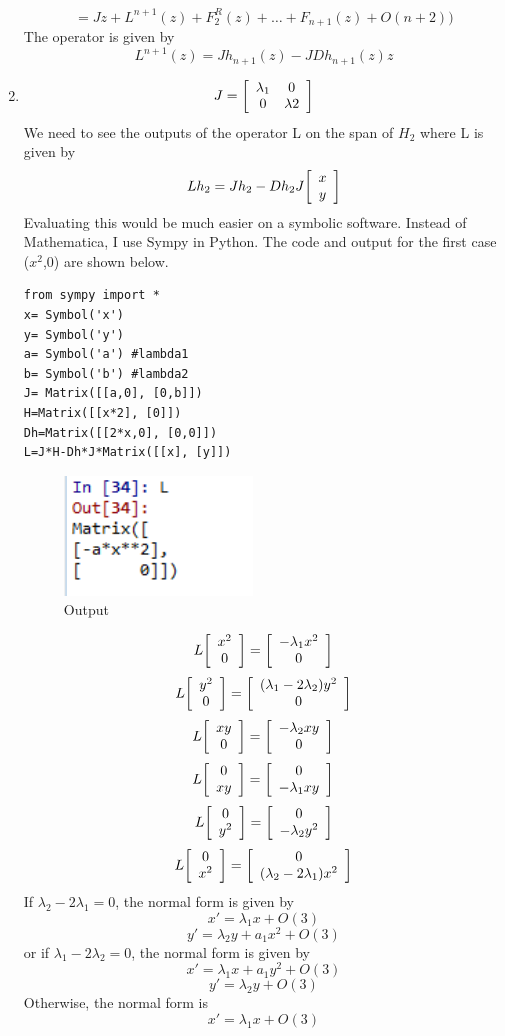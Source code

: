 \documentclass[a4paper,11pt]{article}
\newenvironment{mat}{\left[ \begin{array}{ccccccccccccc}}{\end{array}\right]}
\newcommand\bcm{\begin{mat}}
\newcommand\ecm{\end{mat}}
\begin{document}
\begin{enumerate}
\[= Jz + L^{n+1}(z) + F_2^R(z)+\ldots + F_{n+1}(z)+ O(n+2))\]
The operator is given by
\[ L^{n+1}(z) = Jh_{n+1}(z)-JDh_{n+1}(z)z  \]	
\item 
\[J = \bcm \lambda_1 &0 \\ 0 &\lambda2\ecm\]
We need to see the outputs of the operator L on the span of $H_2$ where L is given by
\[L h_2= Jh_2-Dh_2J\bcm x\\ y\ecm\]
Evaluating this would be much easier on a symbolic software. Instead of Mathematica, I use Sympy in Python. The code and output for the first case ($x^2$,0) are shown below.
	\begin{lstlisting}[style=MyPythonstyle]
from sympy import *
x= Symbol('x')
y= Symbol('y')
a= Symbol('a') #lambda1
b= Symbol('b') #lambda2
J= Matrix([[a,0], [0,b]])
H=Matrix([[x*2], [0]])
Dh=Matrix([[2*x,0], [0,0]])
L=J*H-Dh*J*Matrix([[x], [y]])
	\end{lstlisting}
	\begin{figure}[H]
		\centering
		\includegraphics[width=5cm]{sympy}
		\caption{Output}
	\end{figure}
\[L\bcm x^2\\0 \ecm = \bcm -\lambda_1 x^2\\0 \ecm  \]
\[L\bcm y^2\\0 \ecm = \bcm (\lambda_1 -2\lambda_2) y^2\\0 \ecm  \]
\[L\bcm xy\\0\ecm = \bcm -\lambda_2 xy\\0 \ecm  \]
\[L\bcm 0\\xy\ecm = \bcm  0\\-\lambda_1xy \ecm  \]
\[L\bcm 0\\y^2\ecm = \bcm  0\\-\lambda_2y^2 \ecm  \]
\[L\bcm 0\\x^2\ecm = \bcm  0\\(\lambda_2 -2\lambda_1) x^2 \ecm  \]
If $\lambda_2 -2\lambda_1=0$, the normal form is given by
\[   x'= \lambda_1 x+ O(3)\]
\[   y'= \lambda_2 y+ a_1 x^2+ O(3)\]
or if $\lambda_1 -2\lambda_2=0$, the normal form is given by
\[   x'= \lambda_1 x+a_1 y^2+ O(3)\]
\[   y'= \lambda_2 y+ O(3)\]
Otherwise, the normal form is 
\[   x'= \lambda_1 x+ O(3)\]

\end{enumerate}
\end{document}
